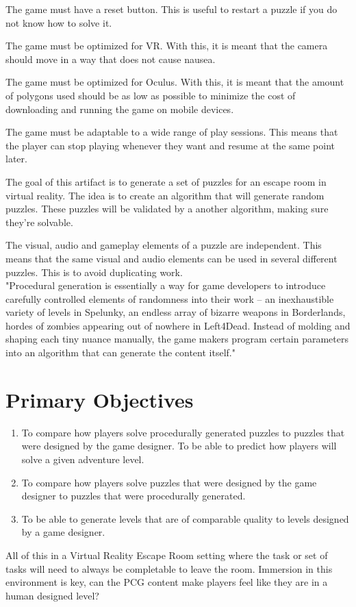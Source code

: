 \documentclass[lettersize,journal]{IEEEtran}
\begin{document}
The game must have a reset button. This is useful to restart a puzzle if you do not know how to solve it.

The game must be optimized for VR. With this, it is meant that the camera should move in a way that does not cause nausea.

The game must be optimized for Oculus. With this, it is meant that the amount of polygons used should be as low as possible to minimize the cost of downloading and running the game on mobile devices.

The game must be adaptable to a wide range of play sessions. This means that the player can stop playing whenever they want and resume at the same point later.

The goal of this artifact is to generate a set of puzzles for an escape room in virtual reality. The idea is to create an algorithm that will generate random puzzles. These puzzles will be validated by a another algorithm, making sure they're solvable.

The visual, audio and gameplay elements of a puzzle are independent. This means that the same visual and audio elements can be used in several different puzzles. This is to avoid duplicating work.\\
"Procedural generation is essentially a way for game developers to introduce carefully controlled elements of randomness into their work – an inexhaustible variety of levels in Spelunky, an endless array of bizarre weapons in Borderlands, hordes of zombies appearing out of nowhere in Left4Dead. Instead of molding and shaping each tiny nuance manually, the game makers program certain parameters into an algorithm that can generate the content itself."\cite{noMan}

\section{Primary Objectives}
\begin{enumerate}
    \item To compare how players solve procedurally generated puzzles to puzzles that were designed by the game designer. To be able to predict how players will solve a given adventure level.

     \item To compare how players solve puzzles that were designed by the game designer to puzzles that were procedurally generated.

     \item To be able to generate levels that are of comparable quality to levels designed by a game designer.
\end{enumerate}
 All of this in a Virtual Reality Escape Room setting where the task or set of tasks will need to always be completable to leave the room.
Immersion in this environment is key, can the PCG content make players feel like they are in a human designed level?
\end{document}
